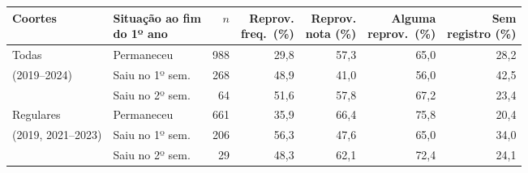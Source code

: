 \begin{tabular}{llrrrrr}
\toprule
Coortes & \makecell[l]{Situação ao fim\\do 1º ano} & $n$ & \makecell[r]{Reprov.\\freq.\ (\%)} & \makecell[r]{Reprov.\\nota (\%)} & \makecell[r]{Alguma\\reprov.\ (\%)} & \makecell[r]{Sem\\registro (\%)} \\
\midrule
Todas & Permaneceu & 988 & 29,8 & 57,3 & 65,0 & 28,2 \\
(2019--2024) & Saiu no 1º sem. & 268 & 48,9 & 41,0 & 56,0 & 42,5 \\
 & Saiu no 2º sem. & 64 & 51,6 & 57,8 & 67,2 & 23,4 \\
Regulares & Permaneceu & 661 & 35,9 & 66,4 & 75,8 & 20,4 \\
(2019, 2021--2023) & Saiu no 1º sem. & 206 & 56,3 & 47,6 & 65,0 & 34,0 \\
 & Saiu no 2º sem. & 29 & 48,3 & 62,1 & 72,4 & 24,1 \\
\bottomrule
\end{tabular}
